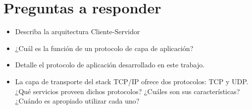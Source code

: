 \section{Preguntas a responder}
\begin{itemize}
    \item Describa la arquitectura Cliente-Servidor
    \item ¿Cuál es la función de un protocolo de capa de aplicación?
    \item Detalle el protocolo de aplicación desarrollado en este trabajo.
    \item La capa de transporte del stack TCP/IP ofrece dos protocolos: TCP y UDP. ¿Qué servicios proveen dichos protocolos?
¿Cuáles son sus características? ¿Cuándo es apropiado utilizar cada uno?
\end{itemize}